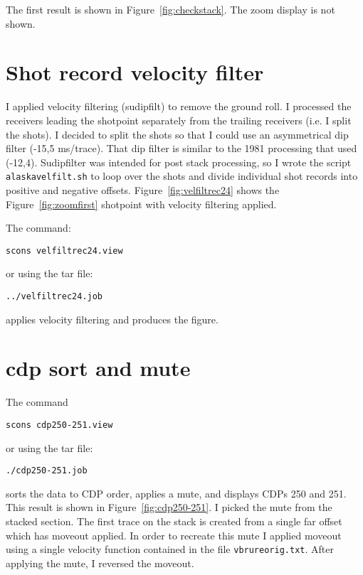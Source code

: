 The first result is shown in Figure~\ref{fig:checkstack}.  The zoom display
is not shown.


\section{Shot record velocity filter}
I applied velocity filtering (sudipfilt) to remove the ground roll.  I
processed the receivers leading the shotpoint separately from the
trailing receivers (i.e. I split the shots).  I decided to split the
shots so that I could use an asymmetrical dip filter (-15,5 ms/trace).
That dip filter is similar to the 1981 processing that used
(-12,4). Sudipfilter was intended for post stack processing, so I
wrote the script \texttt{alaskavelfilt.sh} to loop over the shots and
divide individual shot records into positive and negative offsets.
Figure~\ref{fig:velfiltrec24} shows the Figure~\ref{fig:zoomfirst} 
shotpoint with velocity filtering applied.

The command:
\begin{verbatim}
scons velfiltrec24.view 
\end{verbatim}
or using the tar file:
\begin{verbatim}
../velfiltrec24.job 
\end{verbatim}
applies velocity filtering and produces the figure.


\section{cdp sort and mute}

The command
\begin{verbatim}
scons cdp250-251.view 
\end{verbatim}
or using the tar file:
\begin{verbatim}
./cdp250-251.job
\end{verbatim}
sorts the data to CDP order, applies a mute, and displays CDPs 250 and 
251.  This result is shown in Figure~\ref{fig:cdp250-251}.  I picked 
the mute from the stacked section.  The first trace on the stack is 
created from a single far offset which has moveout applied.  
In order to recreate this mute I applied moveout using a single velocity 
function contained in the file \texttt{vbrureorig.txt}. After applying the 
mute, I reversed the moveout.

